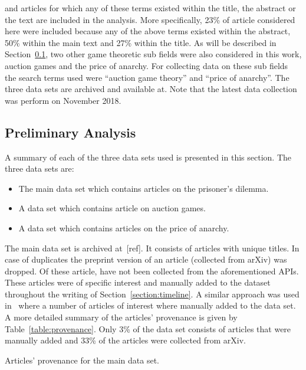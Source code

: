 \documentclass{article}
\theoremstyle{definition}
\newcommand{\totalarticles}{}
\newcommand{\manual}{}
\begin{document}
and articles for which any of these terms existed within the title, the abstract
or the text are included in the analysis. More specifically, 23\% of article
considered here were included because any of the above terms existed within
the abstract, 50\% within the main text and 27\% within the title.
As will be described in Section~\ref{section:preliminary_analysis}, two other
game theoretic sub fields were also considered in this work, auction games and the
price of anarchy. For collecting data on these sub fields the search terms used
were ``auction game theory'' and ``price of anarchy''. The three data sets
are archived and available at. %
Note that the latest data collection was perform on November
2018.%

\subsection{Preliminary Analysis}\label{section:preliminary_analysis}

A summary of each of the three data sets used is presented in this section.
The three data sets are:

\begin{itemize}
    \item The main data set which contains articles on the prisoner's dilemma.
    \item A data set which contains article on auction games.
    \item A data set which contains articles on the price of anarchy.
\end{itemize}

The main data set is archived at~[ref]. It
consists of \totalarticles articles with unique titles. In case of duplicates
the preprint version of an article (collected from arXiv) was dropped.
Of these \totalarticles article, \manual have not been collected from the
aforementioned APIs. These articles were of specific interest and manually added
to the dataset throughout the writing of Section~\ref{section:timeline}. A
similar approach was used in~\cite{Liu2015} where a number of articles of interest
where manually added to the data set. A more
detailed summary of the articles' provenance is given by Table~\ref{table:provenance}.
Only 3\% of the data set consists of articles that were manually added and 33\% of the
articles were collected from arXiv.

\begin{table}[!hbtp]
    \begin{center}
    
    \end{center}
    \caption{Articles' provenance for the main data set.} %
    \label{table:provenance}
\end{table}
\end{document}
